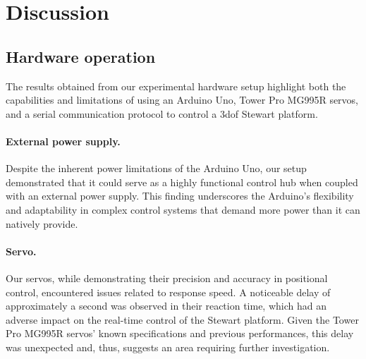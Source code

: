 \section{Discussion}

\subsection{Hardware operation}
The results obtained from our experimental hardware setup highlight both the capabilities and limitations of using an Arduino Uno, Tower Pro MG995R servos, and a serial communication protocol to control a 3dof Stewart platform.
\newline
\paragraph{External power supply.}
Despite the inherent power limitations of the Arduino Uno, our setup demonstrated that it could serve as a highly functional control hub when coupled with an external power supply. This finding underscores the Arduino's flexibility and adaptability in complex control systems that demand more power than it can natively provide.
\newline
\paragraph{Servo.}
Our servos, while demonstrating their precision and accuracy in positional control, encountered issues related to response speed. A noticeable delay of approximately a second was observed in their reaction time, which had an adverse impact on the real-time control of the Stewart platform. Given the Tower Pro MG995R servos' known specifications and previous performances, this delay was unexpected and, thus, suggests an area requiring further investigation.
\newline

